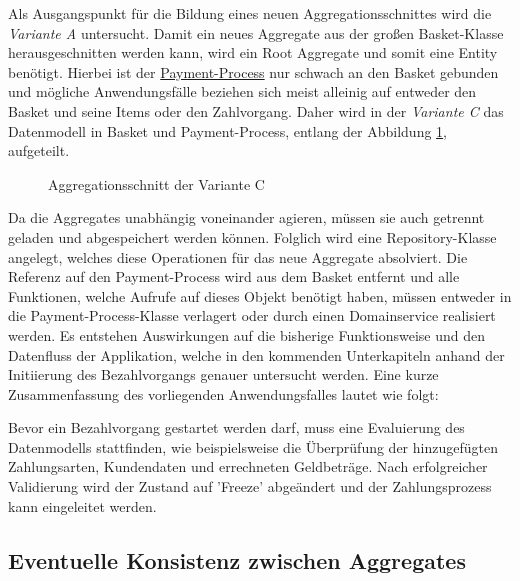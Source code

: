 Als Ausgangspunkt für die Bildung eines neuen Aggregationsschnittes wird die \emph{Variante A} untersucht. Damit ein neues Aggregate aus der großen Basket-Klasse herausgeschnitten werden kann, wird ein Root Aggregate und somit eine Entity benötigt. Hierbei ist der \ul{Payment-Process} nur schwach an den Basket gebunden und mögliche Anwendungsfälle beziehen sich meist alleinig auf entweder den Basket und seine Items oder den Zahlvorgang. Daher wird in der \emph{Variante C} das Datenmodell in Basket und Payment-Process, entlang der Abbildung \ref{fig:VarC}, aufgeteilt. 

\begin{figure}[htbp]
	\vspace{0.3cm}
	\centering
	
	\caption{Aggregationsschnitt der Variante C}
	\label{fig:VarC}
\end{figure}

Da die Aggregates unabhängig voneinander agieren, müssen sie auch getrennt geladen und abgespeichert werden können. Folglich wird eine Repository-Klasse angelegt, welches diese Operationen für das neue Aggregate absolviert. Die Referenz auf den Payment-Process wird aus dem Basket entfernt und alle Funktionen, welche Aufrufe auf dieses Objekt benötigt haben, müssen entweder in die Payment-Process-Klasse verlagert oder durch einen Domainservice realisiert werden. Es entstehen Auswirkungen auf die bisherige Funktionsweise und den Datenfluss der Applikation, welche in den kommenden Unterkapiteln anhand der Initiierung des Bezahlvorgangs genauer untersucht werden. Eine kurze Zusammenfassung des vorliegenden Anwendungsfalles lautet wie folgt:

Bevor ein Bezahlvorgang gestartet werden darf, muss eine Evaluierung des Datenmodells stattfinden, wie beispielsweise die Überprüfung der hinzugefügten Zahlungsarten, Kundendaten und errechneten Geldbeträge. Nach erfolgreicher Validierung wird der Zustand auf 'Freeze' abgeändert und der Zahlungsprozess kann eingeleitet werden.

\subsection{Eventuelle Konsistenz zwischen Aggregates}

